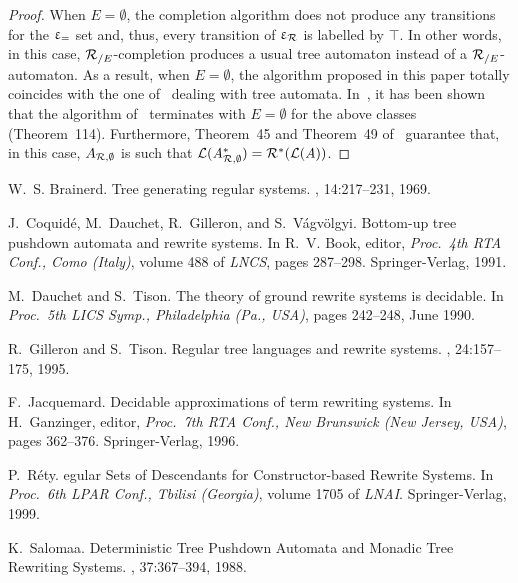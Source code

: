 \begin{proof}
  When $E=\emptyset$, the completion algorithm does not produce any transitions
  for the $\upvarepsilon_{=}$ set and, thus, every transition of $\upvarepsilon_{\mathcal R}$ is
  labelled by $\top$. In other words, in this case, ${\mathcal R_{/E}}$-completion produces a usual
  tree automaton instead of a ${\mathcal R_{/E}}$-automaton. As a result, when $E=\emptyset$,
  the algorithm proposed in this paper totally coincides with the one
  of~\cite{GenetR-JSC10} dealing with tree automata. In~\cite{Genet-Habil}, it
  has been shown that the algorithm of~\cite{GenetR-JSC10} terminates with
  $E=\emptyset$ for the above classes (Theorem~114). Furthermore, Theorem~45 and
  Theorem~49 of~\cite{GenetR-JSC10} guarantee that, in this case,
  $A_{\mathcal R,\emptyset}$ is such that $\mathcal{L}(\mathit A_{\mathcal R,\emptyset}^*)=\mathcal R^*(\mathcal{L}(\mathit A))$.
\end{proof}


\renewcommand{\bibname}{Additional References}
\begin{thebibliography}{10}

W.~S. Brainerd.
\newblock Tree generating regular systems.
, 14:217--231, 1969.

J.~Coquid\'e, M.~Dauchet, R.~Gilleron, and S.~V\'agv\"olgyi.
\newblock Bottom-up tree pushdown automata and rewrite systems.
\newblock In R.~V. Book, editor, {\em Proc.\ 4th RTA Conf., Como (Italy)},
  volume 488 of {\em LNCS}, pages 287--298. Springer-Verlag, 1991.

M.~Dauchet and S.~Tison.
\newblock The theory of ground rewrite systems is decidable.
\newblock In {\em Proc.\ 5th LICS Symp., Philadelphia (Pa., USA)}, pages
  242--248, June 1990.

R.~Gilleron and S.~Tison.
\newblock Regular tree languages and rewrite systems.
, 24:157--175, 1995.

F.~Jacquemard.
\newblock Decidable approximations of term rewriting systems.
\newblock In H.~Ganzinger, editor, {\em Proc.\ 7th RTA Conf., New Brunswick
  (New Jersey, USA)}, pages 362--376. Springer-Verlag, 1996.

P.~R\'ety.
egular {S}ets of {D}escendants for {C}onstructor-based {R}ewrite
  {S}ystems.
\newblock In {\em Proc.\ 6th LPAR Conf., Tbilisi (Georgia)}, volume 1705 of
  {\em LNAI}. Springer-Verlag, 1999.

K.~Salomaa.
\newblock Deterministic {T}ree {P}ushdown {A}utomata and {M}onadic {T}ree
  {R}ewriting {S}ystems.
, 37:367--394, 1988.
\end{thebibliography}


